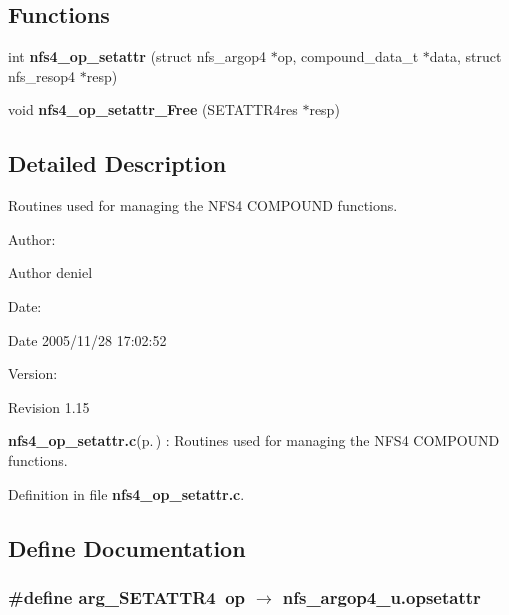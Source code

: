 \subsection*{Functions}
\begin{CompactItemize}
\item 
int {\bf nfs4\_\-op\_\-setattr} (struct nfs\_\-argop4 $\ast$op, compound\_\-data\_\-t $\ast$data, struct nfs\_\-resop4 $\ast$resp)
\item 
void {\bf nfs4\_\-op\_\-setattr\_\-Free} (SETATTR4res $\ast$resp)
\end{CompactItemize}


\subsection{Detailed Description}
Routines used for managing the NFS4 COMPOUND functions. 

\begin{Desc}
\item[Author:]\begin{Desc}
\item[Author]deniel \end{Desc}
\end{Desc}
\begin{Desc}
\item[Date:]\begin{Desc}
\item[Date]2005/11/28 17:02:52 \end{Desc}
\end{Desc}
\begin{Desc}
\item[Version:]\begin{Desc}
\item[Revision]1.15 \end{Desc}
\end{Desc}
{\bf nfs4\_\-op\_\-setattr.c}{\rm (p.\,\pageref{nfs4__op__setattr_8c})} : Routines used for managing the NFS4 COMPOUND functions.

Definition in file {\bf nfs4\_\-op\_\-setattr.c}.

\subsection{Define Documentation}
\subsubsection{\setlength{\rightskip}{0pt plus 5cm}\#define arg\_\-SETATTR4\ op $\rightarrow$ nfs\_\-argop4\_\-u.opsetattr}\label{nfs4__op__setattr_8c_a0}


